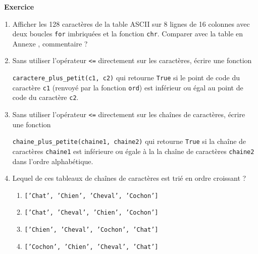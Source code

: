 \documentclass[a4paper, french, 12pt]{article}  %
\newcounter{exo}
\newenvironment{exercice}[1]
{\par \medskip   \addtocounter{exo}{1} \noindent  
\begin{bclogo}[arrondi =0.1,   noborder = true, logo=\bccrayon, marge=4]{~\textbf{Exercice} \textbf{\theexo} {\itshape #1} }  \par}
{
\end{bclogo}
 \par \bigskip }
\newlength{\parpointille}
\newcommand{\Pointilles}[2]{%
\multido{}{#1}{%
\makebox[#2]{\dotfill}\\[\parpointille]
}}
\begin{document}
\vspace*{20pt}


\begin{exercice}{}
 \begin{enumerate}
 
\item Afficher les 128 caractères de la table ASCII sur 8 lignes de 16 colonnes avec deux boucles \texttt{for} imbriquées et la fonction \texttt{chr}. Comparer avec la table en Annexe , commentaire ?

    \Pointilles{6}{\linewidth}
    
    
\item Sans utiliser l'opérateur \texttt{<=} directement sur les caractères, écrire une fonction

 \texttt{caractere\_plus\_petit(c1, c2)} qui retourne \texttt{True} si le point de code du caractère  \texttt{c1} (renvoyé par la fonction \texttt{ord}) est inférieur ou égal au point de code du caractère  \texttt{c2}.
 
 \Pointilles{5}{\linewidth}
 
 

\item  Sans utiliser l'opérateur \texttt{<=} directement sur les chaînes de caractères, écrire une fonction 

\texttt{chaine\_plus\_petite(chaine1, chaine2)} qui retourne \texttt{True} si la chaîne de caractères   \texttt{chaine1} est inférieure ou égale à la la chaîne de caractères   \texttt{chaine2} dans l'ordre alphabétique.

 \Pointilles{8}{\linewidth}

\item Lequel de ces tableaux de chaînes de caractères est trié en ordre croissant ?


\begin{enumerate}
	\item \texttt{['Chat', 'Chien', 'Cheval', 'Cochon']}
	\item \texttt{['Chat', 'Cheval', 'Chien', 'Cochon']}
	\item \texttt{['Chien', 'Cheval', 'Cochon', 'Chat']}
	\item \texttt{['Cochon', 'Chien', 'Cheval', 'Chat']}
\end{enumerate}

\end{enumerate}
\end{exercice}


\vspace*{20pt}
\end{document}

